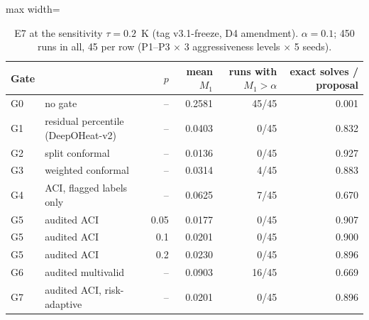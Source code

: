 \begin{table}[t]\centering\small
\begin{adjustbox}{max width=\linewidth}\begin{tabular}{llrrrr}
\hline
Gate & & $p$ & mean $M_1$ & runs with $M_1>\alpha$ & exact solves / proposal \\
\hline
G0 & no gate & -- & 0.2581 & 45/45 & 0.001 \\
G1 & residual percentile (DeepOHeat-v2) & -- & 0.0403 & 0/45 & 0.832 \\
G2 & split conformal & -- & 0.0136 & 0/45 & 0.927 \\
G3 & weighted conformal & -- & 0.0314 & 4/45 & 0.883 \\
G4 & ACI, flagged labels only & -- & 0.0625 & 7/45 & 0.670 \\
G5 & audited ACI & 0.05 & 0.0177 & 0/45 & 0.907 \\
G5 & audited ACI & 0.1 & 0.0201 & 0/45 & 0.900 \\
G5 & audited ACI & 0.2 & 0.0230 & 0/45 & 0.896 \\
G6 & audited multivalid & -- & 0.0903 & 16/45 & 0.669 \\
G7 & audited ACI, risk-adaptive & -- & 0.0201 & 0/45 & 0.896 \\
\hline
\end{tabular}\end{adjustbox}
\caption{E7 at the sensitivity $\tau = 0.2$~K (tag v3.1-freeze, D4 amendment). $\alpha = 0.1$; 450 runs in all, 45 per row (P1--P3 $\times$ 3 aggressiveness levels $\times$ 5 seeds).}
\label{tab:e7-tau02}
\end{table}
